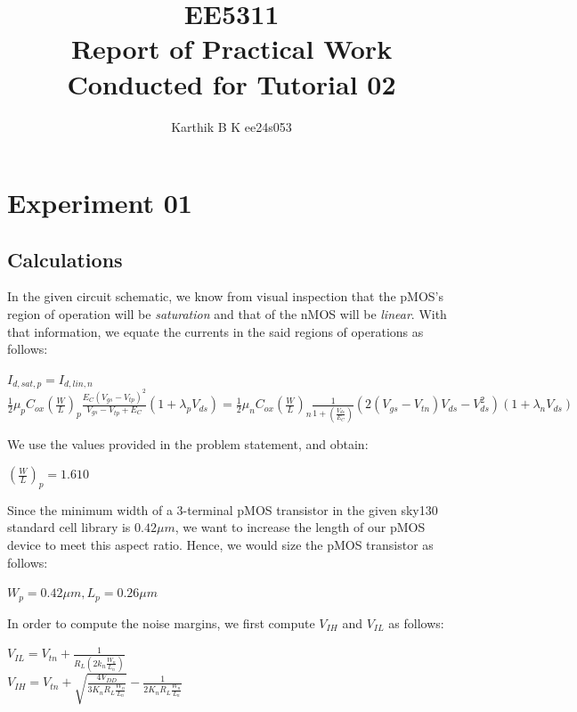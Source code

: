 \documentclass[10pt,a4paper]{article}
\begin{document}
\title{EE5311 \\ Report of Practical Work Conducted for Tutorial 02}
\author{Karthik B K ee24s053}
\maketitle

\section{Experiment 01}
\subsection{Calculations}
In the given circuit schematic, we know from visual inspection that the pMOS's region of operation will be \emph{saturation} and that of the nMOS will be \emph{linear}. With that information, we equate the currents in the said regions of operations as follows:

\begin{center}
    $I_{d,sat,p} = I_{d,lin,n}$ \\
    $\frac{1}{2}\mu_{p}C_{ox}(\frac{W}{L})_{p}\frac{E_{C}(V_{gs}-V_{tp})^{2}}{V_{gs}-V_{tp}+E_{C}}(1+\lambda_{p} V_{ds}) = \frac{1}{2}\mu_{n}C_{ox}(\frac{W}{L})_{n}\frac{1}{1+(\frac{V_{ds}}{E_{C}})}(2(V_{gs}-V_{tn})V_{ds}-V_{ds}^2)(1+\lambda_{n} V_{ds})$
\end{center}

\noindent We use the values provided in the problem statement, and obtain:

\begin{center}
    $(\frac{W}{L})_{p} = 1.610$
\end{center}

\noindent Since the minimum width of a 3-terminal pMOS transistor in the given sky130 standard cell library is $0.42 \mu m$, we want to increase the length of our pMOS device to meet this aspect ratio. Hence, we would size the pMOS transistor as follows:

\begin{center}
    $W_{p} = 0.42 \mu m, L_{p} = 0.26 \mu m$
\end{center}

\noindent In order to compute the noise margins, we first compute $V_{IH}$ and $V_{IL}$ as follows:

\begin{center}
    $V_{IL} = V_{tn} + \frac{1}{R_L(2k_n\frac{W_n}{L_n})}$ \\
    $V_{IH} = V_{tn} + \sqrt{\frac{4V_{DD}}{3K_nR_L\frac{W_n}{L_n}}} - \frac{1}{2K_nR_L\frac{W_n}{L_n}}$
\end{center}
\end{document}
